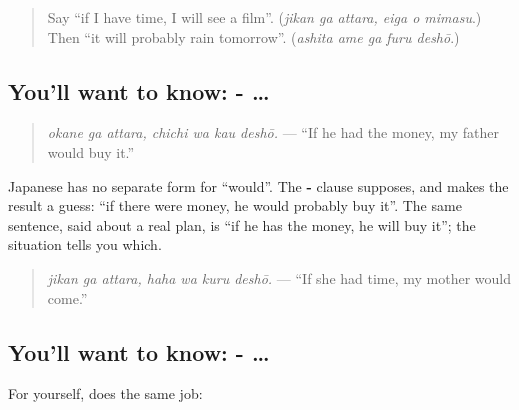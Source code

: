 \label{lesson:JA-C261-kau-deshou}



\begin{quote}
Say \textquotedblleft{}if I have time, I will see a film\textquotedblright{}. (\emph{jikan ga attara, eiga o mimasu}.) Then \textquotedblleft{}it will probably rain tomorrow\textquotedblright{}. (\emph{ashita ame ga furu deshō}.)
\end{quote}

\subsection*{You'll want to know: - … }
\begin{quote}
\textbf{  }
\end{quote}

\begin{quote}
\emph{okane ga attara, chichi wa kau deshō.} — \textquotedblleft{}If he had the money, my father would buy it.\textquotedblright{}
\end{quote}

Japanese has no separate form for \textquotedblleft{}would\textquotedblright{}. The \textbf{-} clause supposes, and \textbf{} makes the result a guess: \textquotedblleft{}if there were money, he would probably buy it\textquotedblright{}. The same sentence, said about a real plan, is \textquotedblleft{}if he has the money, he will buy it\textquotedblright{}; the situation tells you which.

\begin{quote}
\textbf{  }
\end{quote}

\begin{quote}
\emph{jikan ga attara, haha wa kuru deshō.} — \textquotedblleft{}If she had time, my mother would come.\textquotedblright{}
\end{quote}

\subsection*{You'll want to know: - …  }
For yourself, \textbf{ } does the same job:

\begin{quote}
\textbf{  }
\end{quote}


